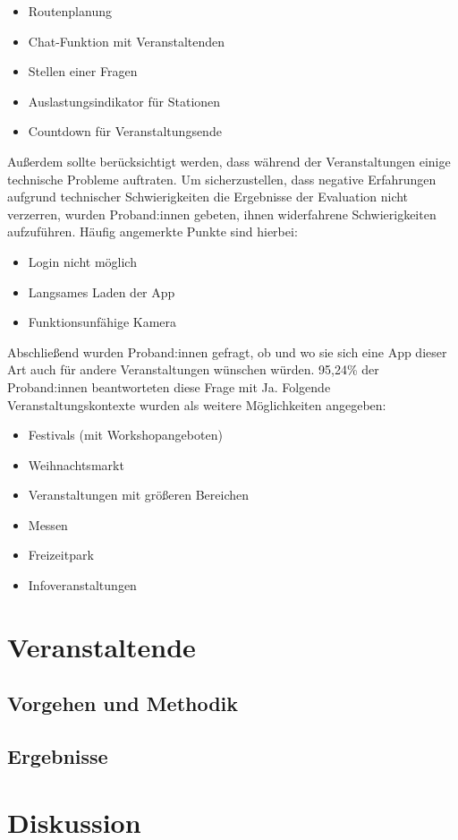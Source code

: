 \begin{itemize}[label=\bullet]
    \item Routenplanung
    \item Chat-Funktion mit Veranstaltenden
    \item Stellen einer Fragen
    \item Auslastungsindikator für Stationen
    \item Countdown für Veranstaltungsende
\end{itemize}

Außerdem sollte berücksichtigt werden, dass während der Veranstaltungen einige
technische Probleme auftraten. Um sicherzustellen, dass negative Erfahrungen
aufgrund technischer Schwierigkeiten die Ergebnisse der Evaluation nicht
verzerren, wurden Proband:innen gebeten, ihnen widerfahrene Schwierigkeiten
aufzuführen. Häufig angemerkte Punkte sind hierbei:

\begin{itemize}[label=\bullet]
    \item Login nicht möglich
    \item Langsames Laden der App
    \item Funktionsunfähige Kamera
\end{itemize}

Abschließend wurden Proband:innen gefragt, ob und wo sie sich eine App dieser
Art auch für andere Veranstaltungen wünschen würden. 95,24\% der Proband:innen
beantworteten diese Frage mit Ja. Folgende Veranstaltungskontexte
wurden als weitere Möglichkeiten angegeben:

\begin{itemize}[label=\bullet]
    \item Festivals (mit Workshopangeboten)
    \item Weihnachtsmarkt
    \item Veranstaltungen mit größeren Bereichen
    \item Messen
    \item Freizeitpark
    \item Infoveranstaltungen
\end{itemize}

\section{Veranstaltende}




\subsection{Vorgehen und Methodik}


\subsection{Ergebnisse}

%

\section{Diskussion}
